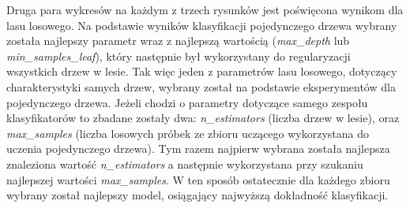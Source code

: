 \documentclass{classrep}
\begin{document}
{{            Druga para wykresów na każdym z trzech rysunków jest poświęcona wynikom dla
            lasu losowego. Na podstawie wyników klasyfikacji pojedynczego drzewa
            wybrany została najlepszy parametr wraz z najlepszą wartością
            (\emph{max\_depth} lub \emph{min\_samples\_leaf}), który następnie był
            wykorzystany do regularyzacji wszystkich drzew w lesie. Tak więc jeden z
            parametrów lasu losowego, dotyczący charakterystyki samych drzew, wybrany
            został na podstawie eksperymentów dla pojedynczego drzewa. Jeżeli chodzi o
            parametry dotyczące samego zespołu klasyfikatorów to zbadane zostały dwa:
            \emph{n\_estimators} (liczba drzew w lesie), oraz \emph{max\_samples}
            (liczba losowych próbek ze zbioru uczącego wykorzystana do uczenia
            pojedynczego drzewa). Tym razem najpierw wybrana została najlepsza
            znaleziona wartość \emph{n\_estimators} a następnie wykorzystana przy
            szukaniu najlepszej wartości \emph{max\_samples}. W ten sposób ostatecznie
            dla każdego zbioru wybrany został najlepszy model, osiągający najwyższą
            dokładność klasyfikacji.

}}
\end{document}
